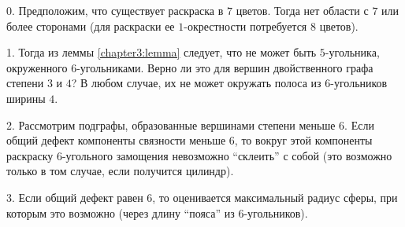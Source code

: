 \begin{myproof}
0. Предположим, что существует раскраска в $7$ цветов. Тогда нет области с $7$ или более сторонами (для раскраски ее $1$-окрестности потребуется $8$ цветов).

1. Тогда из леммы \ref{chapter3:lemma} следует, что не может быть $5$-угольника, окруженного $6$-угольниками. Верно ли это для вершин двойственного графа степени $3$ и $4$? В любом случае, их не может окружать полоса из $6$-угольников ширины $4$.

2. Рассмотрим подграфы, образованные вершинами степени меньше $6$. Если общий дефект компоненты связности меньше $6$, то вокруг этой компоненты раскраску $6$-угольного замощения невозможно \enquote{склеить} с собой (это возможно только в том случае, если получится цилиндр).

3. Если общий дефект равен $6$, то оценивается максимальный радиус сферы, при которым это возможно (через длину \enquote{пояса} из $6$-угольников).
\end{myproof}
